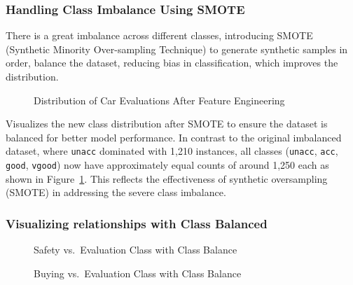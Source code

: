 \documentclass[
  letterpaper,
  DIV=11,
  numbers=noendperiod]{scrartcl}
\begin{document}
\subsubsection{Handling Class Imbalance Using
SMOTE}\label{handling-class-imbalance-using-smote}

There is a great imbalance across different classes, introducing SMOTE
(Synthetic Minority Over-sampling Technique) to generate synthetic
samples in order, balance the dataset, reducing bias in classification,
which improves the distribution.

\begin{figure}


\caption{\label{fig-car_distri_after_enginerring_plot}Distribution of
Car Evaluations After Feature Engineering}

\end{figure}%

Visualizes the new class distribution after SMOTE to ensure the dataset
is balanced for better model performance. In contrast to the original
imbalanced dataset, where \texttt{unacc} dominated with 1,210 instances,
all classes (\texttt{unacc}, \texttt{acc}, \texttt{good},
\texttt{vgood}) now have approximately equal counts of around 1,250 each
as shown in Figure~\ref{fig-car_distri_after_enginerring_plot}. This
reflects the effectiveness of synthetic oversampling (SMOTE) in
addressing the severe class imbalance.

\subsubsection{Visualizing relationships with Class
Balanced}\label{visualizing-relationships-with-class-balanced}

\begin{figure}


\caption{\label{fig-car_safety_balance_plot}Safety vs.~Evaluation Class
with Class Balance}

\end{figure}%

\begin{figure}


\caption{\label{fig-car_buying_balance_plot}Buying vs.~Evaluation Class
with Class Balance}

\end{figure}%
\end{document}
